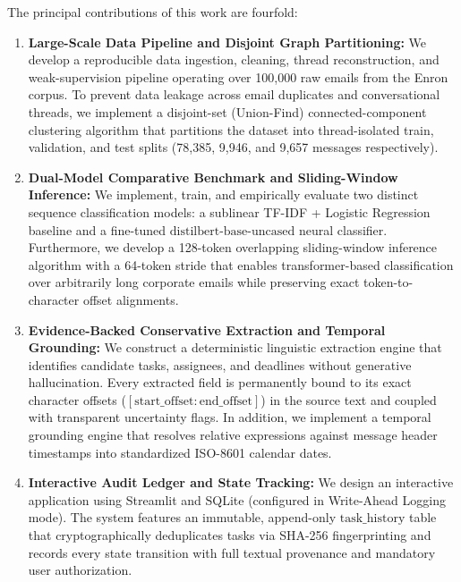 \documentclass[conference]{IEEEtran}
\begin{document}
The principal contributions of this work are fourfold:
\begin{enumerate}
    \item \textbf{Large-Scale Data Pipeline and Disjoint Graph Partitioning:} We develop a reproducible data ingestion, cleaning, thread reconstruction, and weak-supervision pipeline operating over 100,000 raw emails from the Enron corpus. To prevent data leakage across email duplicates and conversational threads, we implement a disjoint-set (Union-Find) connected-component clustering algorithm that partitions the dataset into thread-isolated train, validation, and test splits (78,385, 9,946, and 9,657 messages respectively).
    \item \textbf{Dual-Model Comparative Benchmark and Sliding-Window Inference:} We implement, train, and empirically evaluate two distinct sequence classification models: a sublinear TF-IDF + Logistic Regression baseline and a fine-tuned $\text{distilbert-base-uncased}$ neural classifier. Furthermore, we develop a 128-token overlapping sliding-window inference algorithm with a 64-token stride that enables transformer-based classification over arbitrarily long corporate emails while preserving exact token-to-character offset alignments.
    \item \textbf{Evidence-Backed Conservative Extraction and Temporal Grounding:} We construct a deterministic linguistic extraction engine that identifies candidate tasks, assignees, and deadlines without generative hallucination. Every extracted field is permanently bound to its exact character offsets ($[\text{start\_offset}:\text{end\_offset}]$) in the source text and coupled with transparent uncertainty flags. In addition, we implement a temporal grounding engine that resolves relative expressions against message header timestamps into standardized ISO-8601 calendar dates.
    \item \textbf{Interactive Audit Ledger and State Tracking:} We design an interactive application using Streamlit and SQLite (configured in Write-Ahead Logging mode). The system features an immutable, append-only $\text{task\_history}$ table that cryptographically deduplicates tasks via SHA-256 fingerprinting and records every state transition with full textual provenance and mandatory user authorization.
\end{enumerate}
\end{document}
